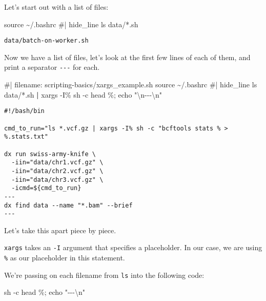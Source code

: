 \documentclass[
  letterpaper,
  DIV=11,
  numbers=noendperiod]{scrreprt}
\newenvironment{Shaded}{\begin{snugshade}}{\end{snugshade}}
\newcommand{\AttributeTok}[1]{\textcolor[rgb]{0.40,0.45,0.13}{#1}}
\newcommand{\BuiltInTok}[1]{\textcolor[rgb]{0.00,0.23,0.31}{#1}}
\newcommand{\CommentTok}[1]{\textcolor[rgb]{0.37,0.37,0.37}{#1}}
\newcommand{\FunctionTok}[1]{\textcolor[rgb]{0.28,0.35,0.67}{#1}}
\newcommand{\KeywordTok}[1]{\textcolor[rgb]{0.00,0.23,0.31}{\textbf{#1}}}
\newcommand{\NormalTok}[1]{\textcolor[rgb]{0.00,0.23,0.31}{#1}}
\newcommand{\PreprocessorTok}[1]{\textcolor[rgb]{0.68,0.00,0.00}{#1}}
\newcommand{\StringTok}[1]{\textcolor[rgb]{0.13,0.47,0.30}{#1}}
\begin{document}
Let's start out with a list of files:

\begin{Shaded}
\begin{Highlighting}[]
\BuiltInTok{source}\NormalTok{ \textasciitilde{}/.bashrc }\CommentTok{\#| hide\_line}
\FunctionTok{ls}\NormalTok{ data/}\PreprocessorTok{*}\NormalTok{.sh}
\end{Highlighting}
\end{Shaded}

\begin{verbatim}
data/batch-on-worker.sh
\end{verbatim}

Now we have a list of files, let's look at the first few lines of each
of them, and print a separator \texttt{-\/-\/-} for each.

\begin{Shaded}
\begin{Highlighting}[]
\CommentTok{\#| filename: scripting{-}basics/xargs\_example.sh}
\BuiltInTok{source}\NormalTok{ \textasciitilde{}/.bashrc }\CommentTok{\#| hide\_line}
\FunctionTok{ls}\NormalTok{ data/}\PreprocessorTok{*}\NormalTok{.sh }\KeywordTok{|} \FunctionTok{xargs} \AttributeTok{{-}I\%}\NormalTok{ sh }\AttributeTok{{-}c} \StringTok{\textquotesingle{}head \%; echo "\textbackslash{}n{-}{-}{-}\textbackslash{}n"\textquotesingle{}}
\end{Highlighting}
\end{Shaded}

\begin{verbatim}
#!/bash/bin

cmd_to_run="ls *.vcf.gz | xargs -I% sh -c "bcftools stats % > %.stats.txt"

dx run swiss-army-knife \
  -iin="data/chr1.vcf.gz" \
  -iin="data/chr2.vcf.gz" \
  -iin="data/chr3.vcf.gz" \
  -icmd=${cmd_to_run}
---
dx find data --name "*.bam" --brief
---
\end{verbatim}

Let's take this apart piece by piece.

\texttt{xargs} takes an \texttt{-I} argument that specifies a
placeholder. In our case, we are using \texttt{\%} as our placeholder in
this statement.

We're passing on each filename from \texttt{ls} into the following code:

\begin{Shaded}
\begin{Highlighting}[]
\FunctionTok{sh} \AttributeTok{{-}c} \StringTok{\textquotesingle{}head \%; echo "{-}{-}{-}\textbackslash{}n"\textquotesingle{}}
\end{Highlighting}
\end{Shaded}
\end{document}
